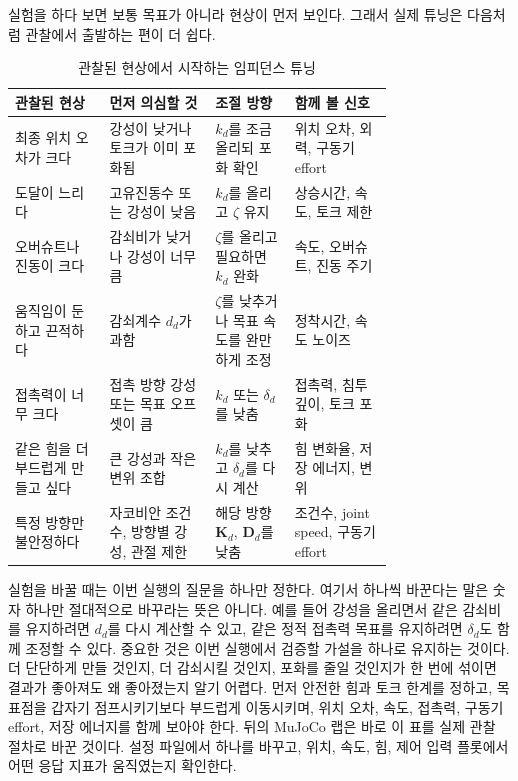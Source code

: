 실험을 하다 보면 보통 목표가 아니라 현상이 먼저 보인다.
그래서 실제 튜닝은 다음처럼 관찰에서 출발하는 편이 더 쉽다.

\begin{table}[H]
  \centering
  \caption{관찰된 현상에서 시작하는 임피던스 튜닝}
  \small
  \setlength{\tabcolsep}{4pt}
  \begin{tabularx}{\linewidth}{@{}>{\raggedright\arraybackslash}p{0.25\linewidth}>{\raggedright\arraybackslash}p{0.29\linewidth}>{\raggedright\arraybackslash}p{0.21\linewidth}>{\raggedright\arraybackslash}X@{}}
    \toprule
    관찰된 현상 & 먼저 의심할 것 & 조절 방향 & 함께 볼 신호 \\
    \midrule
    최종 위치 오차가 크다 & 강성이 낮거나 토크가 이미 포화됨 & $k_d$를 조금 올리되 포화 확인 & 위치 오차, 외력, 구동기 effort \\
    도달이 느리다 & 고유진동수 또는 강성이 낮음 & $k_d$를 올리고 $\zeta$ 유지 & 상승시간, 속도, 토크 제한 \\
    오버슈트나 진동이 크다 & 감쇠비가 낮거나 강성이 너무 큼 & $\zeta$를 올리고 필요하면 $k_d$ 완화 & 속도, 오버슈트, 진동 주기 \\
    움직임이 둔하고 끈적하다 & 감쇠계수 $d_d$가 과함 & $\zeta$를 낮추거나 목표 속도를 완만하게 조정 & 정착시간, 속도 노이즈 \\
    접촉력이 너무 크다 & 접촉 방향 강성 또는 목표 오프셋이 큼 & $k_d$ 또는 $\delta_d$를 낮춤 & 접촉력, 침투 깊이, 토크 포화 \\
    같은 힘을 더 부드럽게 만들고 싶다 & 큰 강성과 작은 변위 조합 & $k_d$를 낮추고 $\delta_d$를 다시 계산 & 힘 변화율, 저장 에너지, 변위 \\
    특정 방향만 불안정하다 & 자코비안 조건수, 방향별 강성, 관절 제한 & 해당 방향 $\bm{K}_d$, $\bm{D}_d$를 낮춤 & 조건수, joint speed, 구동기 effort \\
    \bottomrule
  \end{tabularx}
\end{table}

실험을 바꿀 때는 이번 실행의 질문을 하나만 정한다.
여기서 하나씩 바꾼다는 말은 숫자 하나만 절대적으로 바꾸라는 뜻은 아니다.
예를 들어 강성을 올리면서 같은 감쇠비를 유지하려면 $d_d$를 다시 계산할 수 있고, 같은 정적 접촉력 목표를 유지하려면 $\delta_d$도 함께 조정할 수 있다.
중요한 것은 이번 실행에서 검증할 가설을 하나로 유지하는 것이다.
더 단단하게 만들 것인지, 더 감쇠시킬 것인지, 포화를 줄일 것인지가 한 번에 섞이면 결과가 좋아져도 왜 좋아졌는지 알기 어렵다.
먼저 안전한 힘과 토크 한계를 정하고, 목표점을 갑자기 점프시키기보다 부드럽게 이동시키며, 위치 오차, 속도, 접촉력, 구동기 effort, 저장 에너지를 함께 보아야 한다.
뒤의 MuJoCo 랩은 바로 이 표를 실제 관찰 절차로 바꾼 것이다.
설정 파일에서 하나를 바꾸고, 위치, 속도, 힘, 제어 입력 플롯에서 어떤 응답 지표가 움직였는지 확인한다.

